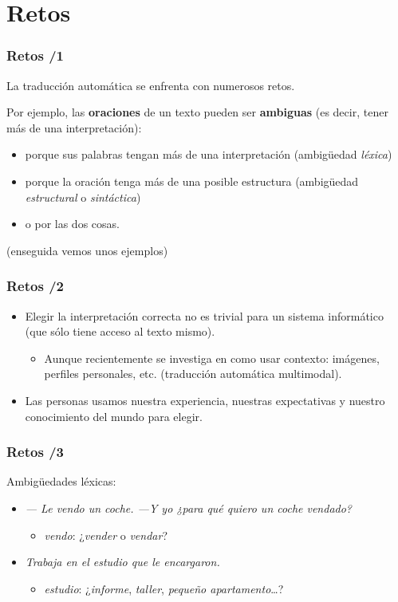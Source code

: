 \documentclass{beamer}
\newcommand{\empha}[1]{\emph{#1}\/}
\begin{document}
\section{Retos}
\begin{frame}
\frametitle{Retos /1}

La traducción automática se enfrenta con numerosos retos.


Por ejemplo, las \textbf{oraciones} de un texto pueden ser
\textbf{ambiguas} (es decir, tener más de una interpretación):

\begin{itemize}
\item porque sus palabras tengan más de una interpretación (ambigüedad
  \empha{léxica})


\item porque la oración tenga más de una posible estructura  (ambigüedad \empha{estructural} o \empha{sintáctica})

\item o por las dos cosas.
\end{itemize}
(enseguida vemos unos ejemplos)
\end{frame}

\begin{frame}
\frametitle{Retos /2}
\begin{itemize}
\item Elegir la interpretación correcta no es trivial para un sistema
informático (que sólo tiene acceso al texto mismo).
\begin{itemize}
\item Aunque recientemente se investiga en como usar  contexto: imágenes, perfiles personales, etc. (traducción automática multimodal).
\end{itemize}

\item Las personas usamos nuestra experiencia, nuestras expectativas y nuestro conocimiento del mundo para elegir.

\end{itemize}



\end{frame} 

\begin{frame}
  \frametitle{Retos /3}
  Ambigüedades léxicas:
  \begin{itemize}
  \item \emph{--- Le vendo un coche. ---Y yo ¿para qué quiero un coche vendado?}
    \begin{itemize}
    \item \emph{vendo}: ¿\emph{vender} o \emph{vendar}?
    \end{itemize}
  \item \emph{Trabaja en el estudio que le encargaron.}
    \begin{itemize}
    \item \emph{estudio}: ¿\emph{informe}, \emph{taller}, \emph{pequeño apartamento}\ldots?
    \end{itemize}
  \end{itemize}
\end{frame}
\end{document}
